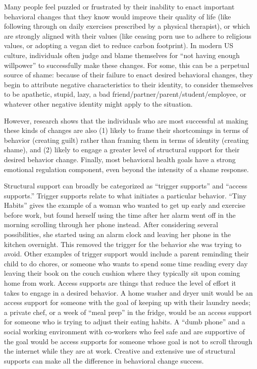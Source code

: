 \documentclass[12pt,letterpaper]{book}
\begin{document}
Many people feel puzzled or frustrated by their inability to enact important behavioral changes that they know would improve their quality of life (like following through on daily exercises prescribed by a physical therapist), or which are strongly aligned with their values (like ceasing porn use to adhere to religious values, or adopting a vegan diet to reduce carbon footprint). In modern US culture, individuals often judge and blame themselves for “not having enough willpower” to successfully make these changes. For some, this can be a perpetual source of shame: because of their failure to enact desired behavioral changes, they begin to attribute negative characteristics to their identity, to consider themselves to be apathetic, stupid, lazy, a bad friend/partner/parent/student/employee, or whatever other negative identity might apply to the situation.

However, research shows that the individuals who are most successful at making these kinds of changes are also (1) likely to frame their shortcomings in terms of behavior (creating guilt) rather than framing them in terms of identity (creating shame), and (2) likely to engage a greater level of structural support for their desired behavior change. Finally, most behavioral health goals have a strong emotional regulation component, even beyond the intensity of a shame response.

Structural support can broadly be categorized as “trigger supports” and “access supports.” Trigger supports relate to what initiates a particular behavior. “Tiny Habits” gives the example of a woman who wanted to get up early and exercise before work, but found herself using the time after her alarm went off in the morning scrolling through her phone instead. After considering several possibilities, she started using an alarm clock and leaving her phone in the kitchen overnight. This removed the trigger for the behavior she was trying to avoid. Other examples of trigger support would include a parent reminding their child to do chores, or someone who wants to spend some time reading every day leaving their book on the couch cushion where they typically sit upon coming home from work. Access supports are things that reduce the level of effort it takes to engage in a desired behavior. A home washer and dryer unit would be an access support for someone with the goal of keeping up with their laundry needs; a private chef, or a week of “meal prep” in the fridge, would be an access support for someone who is trying to adjust their eating habits. A “dumb phone” and a social working environment with co-workers who feel safe and are supportive of the goal would be access supports for someone whose goal is not to scroll through the internet while they are at work. Creative and extensive use of structural supports can make all the difference in behavioral change success.
\end{document}
